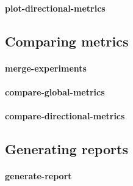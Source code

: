 \paragraph{plot-directional-metrics}

\subsection{Comparing metrics}

\paragraph{merge-experiments}

\paragraph{compare-global-metrics}
\paragraph{compare-directional-metrics}

\subsection{Generating reports}

\paragraph{generate-report}
